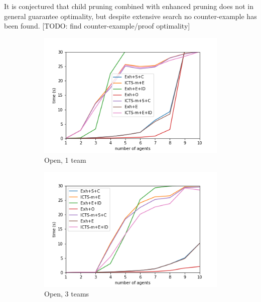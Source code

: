 \documentclass[english]{article}
\begin{document}
It is conjectured that child pruning combined with enhanced pruning does not in general guarantee optimality, but despite extensive search no counter-example has been found. [TODO: find counter-example/proof optimality]
	\begin{figure}
	\centering
	\begin{subfigure}{0.49\textwidth}
		\centering
		\includegraphics[width=\linewidth]{img/results/open-1}
		\caption{Open, 1 team}
		\label{fig:open1}
	\end{subfigure}
	\begin{subfigure}{0.49\textwidth}
		\centering
		\includegraphics[width=\linewidth]{img/results/open-3}
		\caption{Open, 3 teams}
		\label{fig:open3}
	\end{subfigure}
	\begin{subfigure}{0.49\textwidth}
		\centering

\end{subfigure}
\end{figure}
\end{document}
